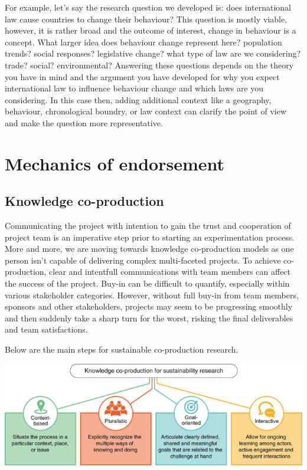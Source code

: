 \documentclass[openany]{book}
\begin{document}
For example, let's say the research question we developed is: does international law cause countries to change their behaviour?
This question is mostly viable, however, it is rather broad and the outcome of interest, change in behaviour is a concept. What larger idea does behaviour change represent here? population trends? social responses? legislative change? what type of law are we considering? trade? social? environmental? Answering these questions depends on the theory you have in mind and the argument you have developed for why you expect international law to influence behaviour change and which laws are you considering. In this case then, adding additional context like a geography, behaviour, chronological boundry, or law context can clarify the point of view and make the question more representative.

\hypertarget{mechanics-of-endorsement}{%
\chapter{Mechanics of endorsement}\label{mechanics-of-endorsement}}

\hypertarget{knowledge-co-production}{%
\section{Knowledge co-production}\label{knowledge-co-production}}

Communicating the project with intention to gain the trust and cooperation of project team is an imperative step prior to starting an experimentation process. More and more, we are moving towards knowledge co-production models as one person isn't capable of delivering complex multi-faceted projects. To achieve co-production, clear and intentfull communications with team members can affect the success of the project. Buy-in can be difficult to quantify, especially within various stakeholder categories. However, without full buy-in from team members, sponsors and other stakeholders, projects may seem to be progressing smoothly and then suddenly take a sharp turn for the worst, risking the final deliverables and team satisfactions.

Below are the main steps for sustainable co-production research.

\includegraphics{fig/team-co-production.png}
\end{document}
